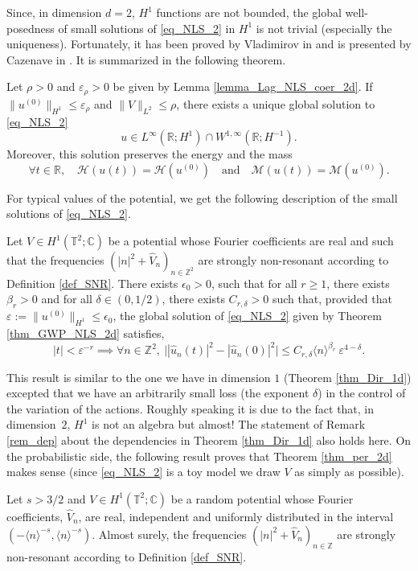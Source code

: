 Since, in dimension $d=2$, $H^1$ functions are not bounded, the global well-posedness of small solutions of \eqref{eq_NLS_2} in $H^1$ is not trivial (especially the uniqueness). Fortunately, it has been proved by Vladimirov in \cite{Vla84} and is presented by Cazenave in \cite[Th.\,3.6.1, p.\,78]{Caz03}. It is summarized in the following theorem.
\begin{theorem}[Global well-posedness, $d=2$, \cite{Vla84}]
\label{thm_GWP_NLS_2d} Let $\rho >0$ and $\varepsilon_{\rho}>0$ be given by Lemma \ref{lemma_Lag_NLS_coer_2d}. If $\|u^{(0)} \|_{H^1} \leq \varepsilon_{\rho}$ and $\| V\|_{L^2} \leq \rho$, there exists a unique global solution to \eqref{eq_NLS_2}
\[
u \in L^\infty(\mathbb{R}; H^1) \cap W^{1,\infty}(\mathbb{R};H^{-1}).
\]
Moreover, this solution preserves the energy and the mass
\[
\forall t\in \mathbb{R}, \quad \mathcal{H}(u(t)) = \mathcal{H}(u^{(0)}) \quad \text{and} \quad \mathcal{M}(u(t)) = \mathcal{M}(u^{(0)}).
\]
\end{theorem}

For typical values of the potential, we get the following description of the small solutions of \eqref{eq_NLS_2}.
\begin{theorem}
\label{thm_per_2d}
Let $V\in H^1(\mathbb T^2;\mathbb{C})$ be a potential whose Fourier coefficients are real and such that the frequencies $(|n|^2+\widehat{V}_n)_{n\in \mathbb{Z}^2}$ are strongly non-resonant according to Definition \ref{def_SNR}. There exists $\epsilon_0>0$, such that for all $r\geq 1$, there exists $\beta_r>0$ and for all $\delta \in (0,1/2)$, there exists $C_{r,\delta}>0$ such that, provided that $\varepsilon:= \| u^{(0)} \|_{H^1} \leq \epsilon_{0}$,
the global solution of \eqref{eq_NLS_2} given by Theorem \ref{thm_GWP_NLS_2d} satisfies,
\[
|t|< \varepsilon^{-r} \implies \forall n \in \mathbb{Z}^2, \ \big| |\widehat{u}_{n}(t)|^2 - |\widehat{u}_{n}(0)|^2 \big| \leq C_{r,\delta} \langle n \rangle^{\beta_r} \ \varepsilon^{4-\delta}.
\]
\end{theorem}
This result is similar to the one we have in dimension $1$ (\ie Theorem \ref{thm_Dir_1d}) excepted that we have an arbitrarily small loss (the exponent $\delta$) in the control of the variation of the actions. Roughly speaking it is due to the fact that, in dimension~$2$, $H^1$ is not an algebra but almost! The statement of Remark \eqref{rem_dep} about the dependencies in Theorem \ref{thm_Dir_1d} also holds here. On the probabilistic side, the following result proves that Theorem \ref{thm_per_2d} makes sense (since \eqref{eq_NLS_2} is a toy model we draw $V$ as simply as possible).
\begin{proposition}
\label{prop_proba_dir_2d}
Let $s>3/2$ and $V \in H^1(\mathbb T^2;\mathbb{C})$ be a random potential whose Fourier coefficients, $\widehat{V}_n$, are real, independent and uniformly distributed in the interval $(-\langle n \rangle^{-s},\langle n \rangle^{-s})$. Almost surely, the frequencies $(|n|^2+\widehat{V}_n)_{n\in \mathbb{Z}}$ are strongly non-resonant according to Definition \ref{def_SNR}.
\end{proposition}

